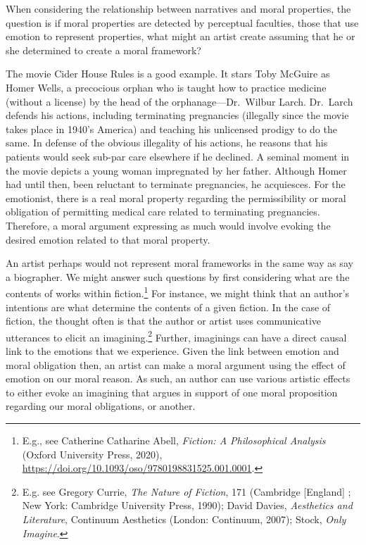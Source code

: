 \documentclass[phdthesis,12pt,final]{wuthesis}
\theoremstyle{definition}
\theoremstyle{definition}
\theoremstyle{definition}
\theoremstyle{definition}
\theoremstyle{remark}
\begin{document}
When considering the relationship between narratives and moral properties, the question is if moral properties are detected by perceptual faculties, those that use emotion to represent properties, what might an artist create assuming that he or she determined to create a moral framework?

The movie Cider House Rules is a good example. It stars Toby McGuire as Homer Wells, a precocious orphan who is taught how to practice medicine (without a license) by the head of the orphanage---Dr.~Wilbur Larch. Dr.~Larch defends his actions, including terminating pregnancies (illegally since the movie takes place in 1940's America) and teaching his unlicensed prodigy to do the same. In defense of the obvious illegality of his actions, he reasons that his patients would seek sub-par care elsewhere if he declined. A seminal moment in the movie depicts a young woman impregnated by her father. Although Homer had until then, been reluctant to terminate pregnancies, he acquiesces. For the emotionist, there is a real moral property regarding the permissibility or moral obligation of permitting medical care related to terminating pregnancies. Therefore, a moral argument expressing as much would involve evoking the desired emotion related to that moral property.

An artist perhaps would not represent moral frameworks in the same way as say a biographer. We might answer such questions by first considering what are the contents of works within fiction.\footnote{E.g., see Catherine Catharine Abell, \emph{Fiction: {A Philosophical Analysis}} (Oxford University Press, 2020), \url{https://doi.org/10.1093/oso/9780198831525.001.0001}.} For instance, we might think that an author's intentions are what determine the contents of a given fiction. In the case of fiction, the thought often is that the author or artist uses communicative utterances to elicit an imagining.\footnote{E.g. see Gregory Currie, \emph{The Nature of Fiction}, 171 (Cambridge {[}England{]} ; New York: Cambridge University Press, 1990); David Davies, \emph{Aesthetics and Literature}, Continuum Aesthetics (London: Continuum, 2007); Stock, \emph{Only Imagine}.} Further, imaginings can have a direct causal link to the emotions that we experience. Given the link between emotion and moral obligation then, an artist can make a moral argument using the effect of emotion on our moral reason. As such, an author can use various artistic effects to either evoke an imagining that argues in support of one moral proposition regarding our moral obligations, or another.
\end{document}
